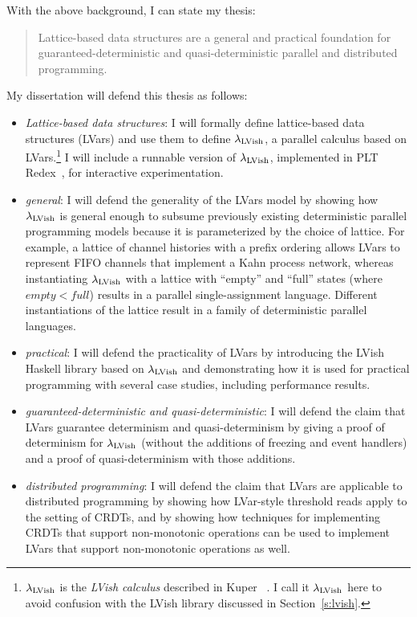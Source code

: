 \documentclass{article}
\begin{document}

With the above background, I can state my thesis:
\begin{quote}
  Lattice-based data structures are a general and practical foundation
  for guaranteed-deterministic and quasi-deterministic parallel and
  distributed programming.
\end{quote}
My dissertation will defend this thesis as follows:
\begin{itemize}
  \item \emph{Lattice-based data structures}: I will formally define
    lattice-based data structures (LVars) and use them to define
    $\lambda_{\textrm{LVish}}$, a parallel calculus based on
    LVars.\footnote{$\lambda_{\textrm{LVish}}$ is the \emph{LVish calculus}
      described in Kuper \etal~\cite{Freeze-paper}.  I call it
      $\lambda_{\textrm{LVish}}$ here to avoid confusion with the LVish library
      discussed in Section~\ref{s:lvish}.}  I will include a runnable
    version of $\lambda_{\textrm{LVish}}$, implemented in PLT
    Redex~\cite{redex-book}, for interactive experimentation.

  \item \emph{general}: I will defend the generality of the LVars
    model by showing how $\lambda_{\textrm{LVish}}$ is general enough to subsume
    previously existing deterministic parallel programming models
    because it is parameterized by the choice of lattice.  For
    example, a lattice of channel histories with a prefix ordering
    allows LVars to represent FIFO channels that implement a Kahn
    process network, whereas instantiating $\lambda_{\textrm{LVish}}$ with a
    lattice with ``empty'' and ``full'' states (where $\mathit{empty}
    < \mathit{full}$) results in a parallel single-assignment
    language.  Different instantiations of the lattice result in a
    family of deterministic parallel languages.

  \item \emph{practical}: I will defend the practicality of LVars by
    introducing the LVish Haskell library based on $\lambda_{\textrm{LVish}}$ and
    demonstrating how it is used for practical programming with
    several case studies, including performance results.

  \item \emph{guaranteed-deterministic and quasi-deterministic}: I
    will defend the claim that LVars guarantee determinism and
    quasi-determinism by giving a proof of determinism for
    $\lambda_{\textrm{LVish}}$ (without the additions of freezing and event
    handlers) and a proof of quasi-determinism with those additions.

  \item \emph{distributed programming}: I will defend the claim that
    LVars are applicable to distributed programming by showing how
    LVar-style threshold reads apply to the setting of CRDTs, and by
    showing how techniques for implementing CRDTs that support
    non-monotonic operations can be used to implement LVars that
    support non-monotonic operations as well.
\end{itemize}
\end{document}
